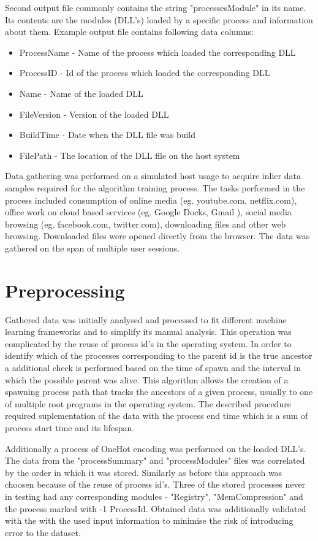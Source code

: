\documentclass[a4paper,twoside,12pt]{book}
\begin{document}
Second output file commonly contains the string "processesModule" in its name. Its contents
are the modules (DLL's) loaded by a specific process and information about them. Example 
output file contains following data columns:
\begin{itemize}
	\item ProcessName - Name of the process which loaded the corresponding DLL
	\item ProcessID - Id of the process which loaded the corresponding DLL
	\item Name - Name of the loaded DLL
	\item FileVersion - Version of the loaded DLL
	\item BuildTime - Date when the DLL file was build
	\item FilePath - The location of the DLL file on the host system
\end{itemize}

Data gathering was performed on a simulated host usage to acquire inlier data samples required 
for the algorithm training process. The tasks performed in the process 
included consumption of online media (eg. youtube.com, netflix.com), office work on cloud 
based services (eg. Google Docks, Gmail ), social media browsing (eg. facebook.com, 
twitter.com), downloading files and other web browsing. Downloaded files were opened 
directly from the browser. The data was gathered on the span of multiple user sessions.

\section{Preprocessing}

Gathered data was initially analysed and processed to fit different machine learning 
frameworks and to simplify its manual analysis. This operation was complicated by the 
reuse of process id's in the operating system. In order to identify which of the processes 
corresponding to the parent id is the true ancestor a additional check is performed based 
on the time of spawn and the interval in which the possible parent was alive. This algorithm 
allows the creation of a spawning process path that tracks the ancestors of a given process, 
usually to one of multiple root programs in the operating system. The described procedure
required suplementation of the data with the process end time which is a sum of process
start time and its lifespan. 

Additionally a process of OneHot encoding was performed on the loaded DLL's. The data from 
the "processSummary" and "processModules" files was correlated by the order in which it was 
stored. Similarly as before this approach was choosen because of the reuse of process id's.
Three of the stored processes never in testing had any corresponding modules - 
"Registry", "MemCompression" and the process marked with -1 ProcessId. Obtained data was
additionally validated with the with the used input information to minimise the risk of 
introducing error to the dataset.
\end{document}
